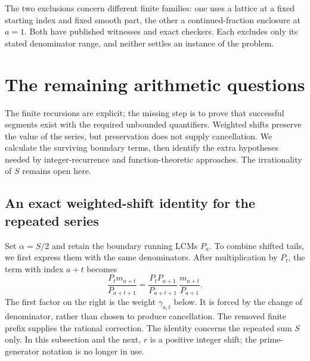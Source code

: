 The two exclusions concern different finite families: one uses a
lattice at a fixed starting index and fixed smooth part, the other a continued-fraction
enclosure at $a=1$.  Both have published witnesses and exact checkers.
Each excludes only its stated denominator range, and neither settles an
instance of the problem.

\section{The remaining arithmetic questions}\label{long269:sec:open}

The finite recursions are explicit; the missing step is to prove that
successful segments exist with the required unbounded quantifiers.
Weighted shifts preserve the value of the series, but preservation does
not supply cancellation. We calculate the surviving boundary terms,
then identify the extra hypotheses needed by integer-recurrence and
function-theoretic approaches. The irrationality of $S$ remains open here.

\subsection{An exact weighted-shift identity for the repeated series}
\label{long269:sec:weighted-shifts}
Set $\alpha=S/2$ and retain the boundary running LCMs $P_a$. To combine
shifted tails, we first express them with the same denominators. After
multiplication by $P_t$, the term with index $a+t$ becomes
\[
 \frac{P_t m_{a+t}}{P_{a+t+1}}
 =\frac{P_tP_{a+1}}{P_{a+t+1}}\,
   \frac{m_{a+t}}{P_{a+1}}.
\]
The first factor on the right is the weight $\gamma_{a,t}$ below. It is
forced by the change of denominator, rather than chosen to produce
cancellation. The removed finite prefix supplies the rational correction.
The identity concerns the repeated sum $S$ only. In this subsection and
the next, $r$ is a positive integer shift; the prime-generator notation is
no longer in use.

